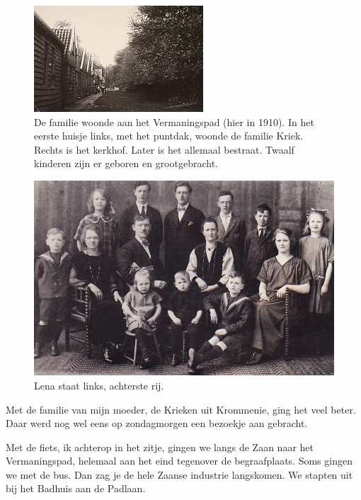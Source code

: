 \documentclass[12pt,twoside, openright]{memoir}
\begin{document}
\begin{figure}
\includegraphics[width=\textwidth]{img/ch3/Vermaningspad1910}
\caption*{\footnotesize De familie woonde aan het Vermaningspad (hier in 1910). In het eerste huisje links, met het puntdak, woonde de familie Kriek. Rechts is het kerkhof. Later is het allemaal bestraat. Twaalf kinderen zijn er geboren en grootgebracht.}
\end{figure}

\begin{figure}
\includegraphics[width=\textwidth]{img/ch3/familie}
\caption*{\footnotesize Lena staat links, achterste rij.}
\end{figure}

Met de familie van mijn moeder, de Krieken uit Krommenie, ging het veel beter. Daar werd nog wel eens op zondagmorgen een bezoekje aan gebracht.   

Met de fiets, ik achterop in het zitje, gingen we langs de Zaan naar het Vermaningspad, helemaal aan het eind tegenover de begraafplaats. Soms gingen we met de bus. Dan zag je de hele Zaanse industrie langskomen. We stapten uit bij het Badhuis aan de Padlaan. 
\end{document}

